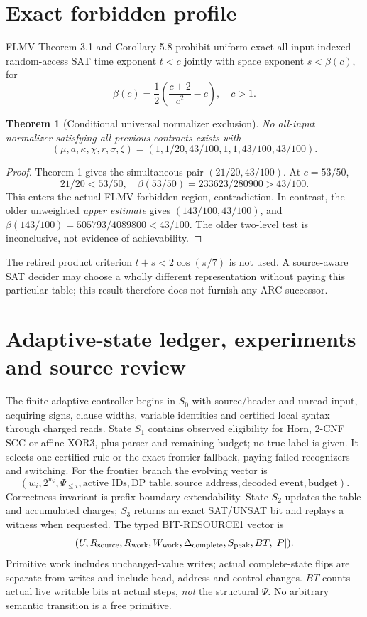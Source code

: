 \documentclass[11pt]{article}
\newtheorem{theorem}{Theorem}
\begin{document}
\section{Exact forbidden profile}
FLMV Theorem 3.1 and Corollary 5.8 prohibit uniform exact all-input indexed random-access SAT time exponent \(t<c\) jointly with space exponent \(s<\beta(c)\), for
\[
 \beta(c)=\frac12\left(\frac{c+2}{c^2}-c\right),\quad c>1.
 \tag{4}
\]
\begin{theorem}[Conditional universal normalizer exclusion]
No all-input normalizer satisfying all previous contracts exists with
\[
(\mu,a,\kappa,\chi,r,\sigma,\zeta)
=(1,1/20,43/100,1,1,43/100,43/100).
\]
\end{theorem}
\begin{proof}
Theorem 1 gives the simultaneous pair \((21/20,43/100)\). At \(c=53/50\),
\[
 21/20<53/50,\quad
 \beta(53/50)=233623/280900>43/100.
\]
This enters the actual FLMV forbidden region, contradiction. In contrast, the older unweighted \emph{upper estimate} gives \((143/100,43/100)\), and \(\beta(143/100)=505793/4089800<43/100\). The older two-level test is inconclusive, not evidence of achievability.
\end{proof}
The retired product criterion \(t+s<2\cos(\pi/7)\) is not used. A source-aware SAT decider may choose a wholly different representation without paying this particular table; this result therefore does not furnish any ARC successor.

\section{Adaptive-state ledger, experiments and source review}
The finite adaptive controller begins in \(S_0\) with source/header and unread input, acquiring signs, clause widths, variable identities and certified local syntax through charged reads. State \(S_1\) contains observed eligibility for Horn, 2-CNF SCC or affine XOR3, plus parser and remaining budget; no true label is given. It selects one certified rule or the exact frontier fallback, paying failed recognizers and switching. For the frontier branch the evolving vector is
\[
 (w_i,2^{w_i},\Psi_{\le i},\text{active IDs},\text{DP table},
 \text{source address},\text{decoded event},\text{budget}).
\]
Correctness invariant is prefix-boundary extendability. State \(S_2\) updates the table and accumulated charges; \(S_3\) returns an exact SAT/UNSAT bit and replays a witness when requested. The typed BIT-RESOURCE1 vector is
\[
(U,R_{\rm source},R_{\rm work},W_{\rm work},
\Delta_{\rm complete},S_{\rm peak},BT,|P|).
\]
Primitive work includes unchanged-value writes; actual complete-state flips are separate from writes and include head, address and control changes. \(BT\) counts actual live writable bits at actual steps, \emph{not} the structural \(\Psi\). No arbitrary semantic transition is a free primitive.
\end{document}
